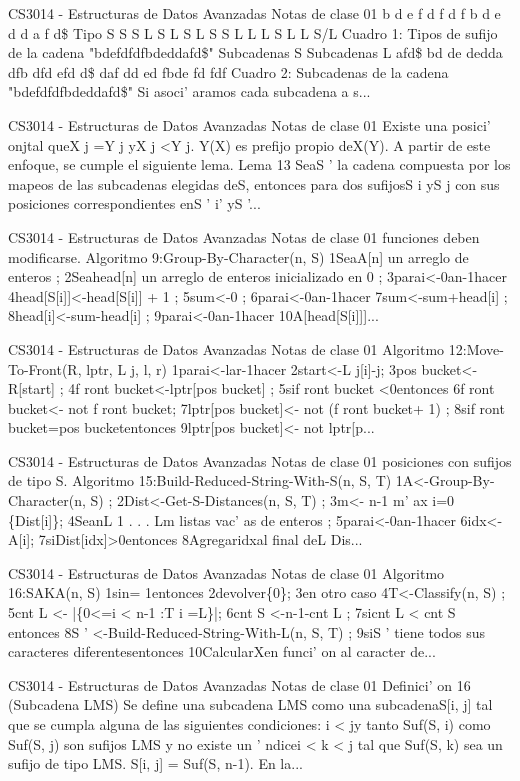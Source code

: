 \begin{description}[leftmargin=!,labelwidth=4.2em,style=nextline]
\item[Pag. 13] CS3014 - Estructuras de Datos Avanzadas Notas de clase 01 b d e f d f d f b d e d d a f d\$ Tipo S S S L S L S L S S L L L S L L S/L Cuadro 1: Tipos de sufijo de la cadena "bdefdfdfbdeddafd\$" Subcadenas S Subcadenas L afd\$ bd de dedda dfb dfd efd d\$ daf dd ed fbde fd fdf Cuadro 2: Subcadenas de la cadena "bdefdfdfbdeddafd\$" Si asoci' aramos cada subcadena a s...
\item[Pag. 14] CS3014 - Estructuras de Datos Avanzadas Notas de clase 01 Existe una posici' onjtal queX j  =Y j yX j <Y j. Y(X) es prefijo propio deX(Y). A partir de este enfoque, se cumple el siguiente lema. Lema 13 SeaS ' la cadena compuesta por los mapeos de las subcadenas elegidas deS, entonces para dos sufijosS i yS j con sus posiciones correspondientes enS ' i' yS '...
\item[Pag. 15] CS3014 - Estructuras de Datos Avanzadas Notas de clase 01 funciones deben modificarse. Algoritmo 9:Group-By-Character(n, S) 1SeaA[n] un arreglo de enteros ; 2Seahead[n] un arreglo de enteros inicializado en 0 ; 3parai<-0an-1hacer 4head[S[i]]<-head[S[i]] + 1 ; 5sum<-0 ; 6parai<-0an-1hacer 7sum<-sum+head[i] ; 8head[i]<-sum-head[i] ; 9parai<-0an-1hacer 10A[head[S[i]]]...
\item[Pag. 16] CS3014 - Estructuras de Datos Avanzadas Notas de clase 01 Algoritmo 12:Move-To-Front(R, lptr, L j, l, r) 1parai<-lar-1hacer 2start<-L j[i]-j; 3pos bucket<-R[start] ; 4f ront bucket<-lptr[pos bucket] ; 5sif ront bucket <0entonces 6f ront bucket<- not f ront bucket; 7lptr[pos bucket]<- not (f ront bucket+ 1) ; 8sif ront bucket=pos bucketentonces 9lptr[pos bucket]<- not lptr[p...
\item[Pag. 17] CS3014 - Estructuras de Datos Avanzadas Notas de clase 01 posiciones con sufijos de tipo S. Algoritmo 15:Build-Reduced-String-With-S(n, S, T) 1A<-Group-By-Character(n, S) ; 2Dist<-Get-S-Distances(n, S, T) ; 3m<- n-1 m' ax i=0 \{Dist[i]\}; 4SeanL 1 . . . Lm listas vac'  as de enteros ; 5parai<-0an-1hacer 6idx<-A[i]; 7siDist[idx]>0entonces 8Agregaridxal final deL Dis...
\item[Pag. 18] CS3014 - Estructuras de Datos Avanzadas Notas de clase 01 Algoritmo 16:SAKA(n, S) 1sin= 1entonces 2devolver\{0\}; 3en otro caso 4T<-Classify(n, S) ; 5cnt L <- |\{0<=i < n-1 :T i =L\}|; 6cnt S <-n-1-cnt L ; 7sicnt L < cnt S entonces 8S ' <-Build-Reduced-String-With-L(n, S, T) ; 9siS ' tiene todos sus caracteres diferentesentonces 10CalcularXen funci' on al caracter de...
\item[Pag. 19] CS3014 - Estructuras de Datos Avanzadas Notas de clase 01 Definici' on 16 (Subcadena LMS) Se define una subcadena LMS como una subcadenaS[i, j] tal que se cumpla alguna de las siguientes condiciones: i < jy tanto Suf(S, i) como Suf(S, j) son sufijos LMS y no existe un '  ndicei < k < j tal que Suf(S, k) sea un sufijo de tipo LMS. S[i, j] = Suf(S, n-1). En la...

\end{description}
